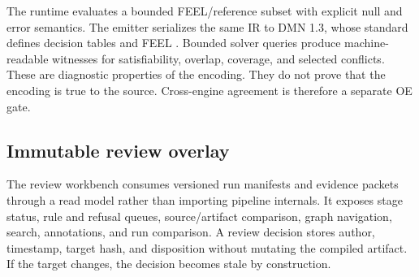 The runtime evaluates a bounded FEEL/reference subset with explicit null and
error semantics. The emitter serializes the same IR to DMN 1.3, whose standard
defines decision tables and FEEL \citep{omg2021dmn}. Bounded solver queries
produce machine-readable witnesses for satisfiability, overlap, coverage, and
selected conflicts. These are diagnostic properties of the encoding. They do
not prove that the encoding is true to the source. Cross-engine agreement is
therefore a separate OE gate.

\subsection{Immutable review overlay}

The review workbench consumes versioned run manifests and evidence packets
through a read model rather than importing pipeline internals. It exposes stage
status, rule and refusal queues, source/artifact comparison, graph navigation,
search, annotations, and run comparison. A review decision stores author,
timestamp, target hash, and disposition without mutating the compiled artifact.
If the target changes, the decision becomes stale by construction.
